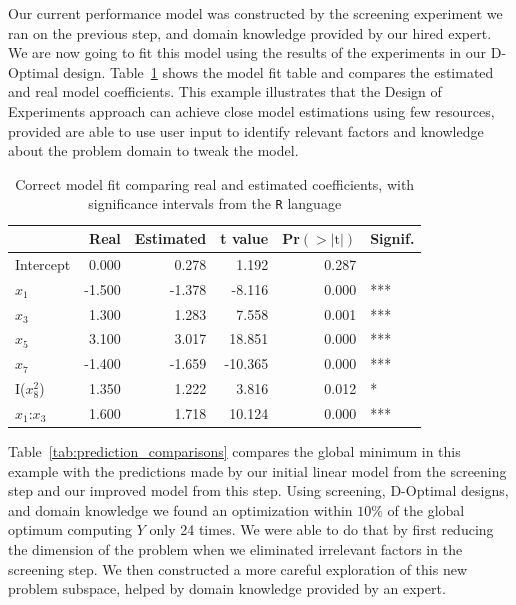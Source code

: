 \documentclass[conference]{IEEEtran}
\begin{document}
Our current performance model was constructed by the screening experiment we ran
on the previous step, and domain knowledge provided by our hired expert. We are
now going to fit this model using the results of the experiments in our
D-Optimal design. Table~\ref{tab:correct_fit} shows the model fit table and
compares the estimated and real model coefficients. This example illustrates
that the Design of Experiments approach can achieve close model estimations
using few resources, provided are able to use user input to identify relevant
factors and knowledge about the problem domain to tweak the model.

\begin{table}[ht]
\centering
\caption{Correct model fit comparing real and estimated coefficients, with significance intervals from the \texttt{R} language}
\label{tab:correct_fit}
\begingroup\small
\begin{tabular}{lrrrrl}
  \toprule
 & Real & Estimated & t value & Pr$(>|\text{t}|)$ & Signif. \\
  \midrule
Intercept & 0.000 & 0.278 & 1.192 & 0.287 &   \\
  $x_1$ & -1.500 & -1.378 & -8.116 & 0.000 & *** \\
  $x_3$ & 1.300 & 1.283 & 7.558 & 0.001 & *** \\
  $x_5$ & 3.100 & 3.017 & 18.851 & 0.000 & *** \\
  $x_7$ & -1.400 & -1.659 & -10.365 & 0.000 & *** \\
  I($x_8^2$) & 1.350 & 1.222 & 3.816 & 0.012 & * \\
  $x_1$:$x_3$ & 1.600 & 1.718 & 10.124 & 0.000 & *** \\
   \bottomrule
\end{tabular}
\endgroup
\end{table}

Table~\ref{tab:prediction_comparisons} compares the global minimum in this
example with the predictions made by our initial linear model from the screening
step and our improved model from this step. Using screening, D-Optimal designs,
and domain knowledge we found an optimization within \(10\%\) of the global
optimum computing \(Y\) only 24 times. We were able to do that by first reducing
the dimension of the problem when we eliminated irrelevant factors in the
screening step. We then constructed a more careful exploration of this new
problem subspace, helped by domain knowledge provided by an expert.
\end{document}
